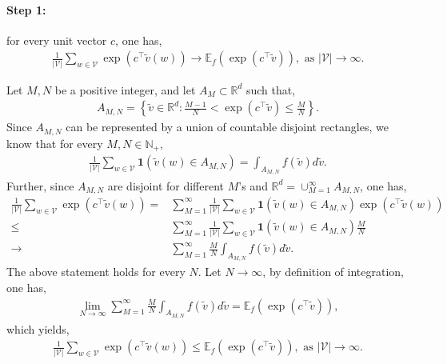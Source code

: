 \documentclass{article} \usepackage{acl2017,times}
\newenvironment{proof}[1][Proof]{\begin{trivlist}
\item[\hskip \labelsep {\bfseries #1}]}{\end{trivlist}}
\begin{document}
\paragraph{Step 1:} for every unit vector $c$, one has,
\begin{align}
    \frac{1}{|\mathcal{V}|}\sum_{w\in \mathcal{V}} \exp\left(c^{\top} \tilde{v}(w)\right) \to \mathbb{E}_{f} \left(\exp\left(c^{\top} \tilde{v} \right)\right), \textrm{ as } |\mathcal{V}| \to \infty. \label{eq:converge}
\end{align}
\begin{proof}
    Let $M, N$ be a positive integer, and let $A_M\subset \mathbb{R}^d$ such that,
    \begin{align*}
        A_{M, N} = \left\{\tilde{v} \in \mathbb{R}^d: \frac{M-1}{N}<\exp(c^{\top} \tilde{v}) \le \frac{M}{N}\right\}.
    \end{align*}
    Since $A_{M,N}$ can be represented by a union of countable disjoint rectangles, we know that for every $M, N \in \mathbb{N}_+$,
    \begin{align*}
        \frac{1}{|\mathcal{V}|}\sum_{w\in \mathcal{V}} \mathbf{1}(\tilde{v}(w) \in A_{M,N}) = \int_{A_{M,N}} f(\tilde{v}) d\tilde{v}. 
    \end{align*}
    Further, since $A_{M,N}$ are disjoint for different $M$'s and $\mathbb{R}^d = \cup_{M=1}^{\infty} A_{M,N}$, one has,
    \begin{align*}
        \frac{1}{|\mathcal{V}|}\sum_{w\in \mathcal{V}} \exp\left(c^{\top} \tilde{v}(w)\right) =& \sum_{M=1}^{\infty} \frac{1}{|\mathcal{V}|}\sum_{w\in \mathcal{V}} \mathbf{1}(\tilde{v}(w)\in A_{M,N}) \exp(c^{\top}  \tilde{v}(w)) \\
        \le & \sum_{M=1}^{\infty} \frac{1}{|\mathcal{V}|}\sum_{w\in \mathcal{V}} \mathbf{1}(\tilde{v}(w)\in A_{M,N}) \frac{M}{N} \\
        \to & \sum_{M=1}^{\infty} \frac{M}{N} \int_{A_{M,N}} f(\tilde{v})d\tilde{v}.
   \end{align*}
   The above statement holds for every $N$. Let $N\to \infty$, by definition of integration, one has,
   \begin{align*}
        \lim_{N\to\infty} \sum_{M=1}^{\infty} \frac{M}{N} \int_{A_{M,N}} f(\tilde{v})d\tilde{v} = \mathbb{E}_{f} \left(\exp\left(c^{\top} \tilde{v} \right)\right), 
   \end{align*}
    which yields,
    \begin{align}
        \frac{1}{|\mathcal{V}|}\sum_{w\in \mathcal{V}} \exp\left(c^{\top} \tilde{v}(w)\right) \le \mathbb{E}_{f} \left(\exp\left(c^{\top} \tilde{v} \right)\right), \textrm{ as }|\mathcal{V}| \to \infty.\label{eq:converge-rhs}

\end{align}
\end{proof}
\end{document}
